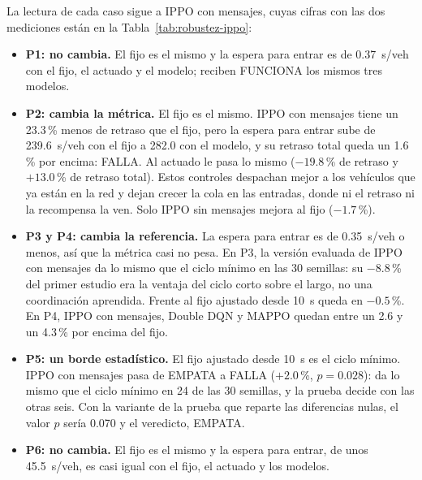 La lectura de cada caso sigue a IPPO con mensajes, cuyas cifras con las
dos mediciones están en la Tabla~\ref{tab:robustez-ippo}:
\begin{itemize}
  \item \textbf{P1: no cambia.} El fijo es el mismo y la espera para
    entrar es de 0.37~s/veh con el fijo, el actuado y el modelo; reciben
    FUNCIONA los mismos tres modelos.
  \item \textbf{P2: cambia la métrica.} El fijo es el mismo. IPPO con
    mensajes tiene un 23.3\,\% menos de retraso que el fijo, pero la
    espera para entrar sube de 239.6~s/veh con el fijo a 282.0 con el
    modelo, y su retraso total queda un 1.6\,\% por encima: FALLA. Al
    actuado le pasa lo mismo ($-19.8$\,\% de retraso y $+13.0$\,\% de
    retraso total). Estos controles despachan mejor a los vehículos que
    ya están en la red y dejan crecer la cola en las entradas, donde ni
    el retraso ni la recompensa la ven. Solo IPPO sin mensajes mejora al
    fijo ($-1.7$\,\%).
  \item \textbf{P3 y P4: cambia la referencia.} La espera para entrar
    es de 0.35~s/veh o menos, así que la métrica casi no pesa. En P3, la
    versión evaluada de IPPO con mensajes da lo mismo que el ciclo
    mínimo en las 30 semillas: su $-8.8$\,\% del primer estudio era la
    ventaja del ciclo corto sobre el largo, no una coordinación
    aprendida. Frente al fijo ajustado desde 10~s queda en $-0.5$\,\%.
    En P4, IPPO con mensajes, Double DQN y MAPPO quedan entre un 2.6 y
    un 4.3\,\% por encima del fijo.
  \item \textbf{P5: un borde estadístico.} El fijo ajustado desde 10~s
    es el ciclo mínimo. IPPO con mensajes pasa de EMPATA a FALLA
    ($+2.0$\,\%, $p = 0.028$): da lo mismo que el ciclo mínimo en 24 de
    las 30 semillas, y la prueba decide con las otras seis. Con la
    variante de la prueba que reparte las diferencias nulas, el valor
    $p$ sería 0.070 y el veredicto, EMPATA.
  \item \textbf{P6: no cambia.} El fijo es el mismo y la espera para
    entrar, de unos 45.5~s/veh, es casi igual con el fijo, el actuado y
    los modelos.
\end{itemize}

